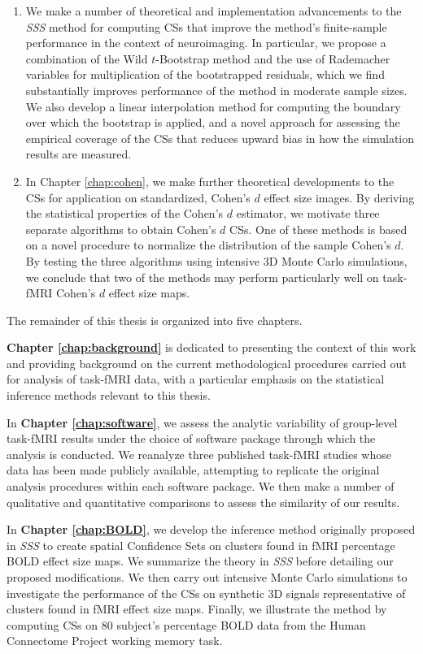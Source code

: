 \begin{enumerate}
\item We make a number of theoretical and implementation advancements to the \textit{SSS} method for computing CSs that improve the method's finite-sample performance in the context of neuroimaging. In particular, we propose a combination of the Wild $t$-Bootstrap method and the use of Rademacher variables for multiplication of the bootstrapped residuals, which we find substantially improves performance of the method in moderate sample sizes. We also develop a linear interpolation method for computing the boundary over which the bootstrap is applied, and a novel approach for assessing the empirical coverage of the CSs that reduces upward bias in how the simulation results are measured.

\item In Chapter \ref{chap:cohen}, we make further theoretical developments to the CSs for application on standardized, Cohen's $d$ effect size images. By deriving the statistical properties of the Cohen's $d$ estimator, we motivate three separate algorithms to obtain Cohen's $d$ CSs. One of these methods is based on a novel procedure to normalize the distribution of the sample Cohen's $d$. By testing the three algorithms using intensive 3D Monte Carlo simulations, we conclude that two of the methods may perform particularly well on task-fMRI Cohen's $d$ effect size maps.

\end{enumerate}


\noindent The remainder of this thesis is organized into five chapters. 

\textbf{Chapter \ref{chap:background}} is dedicated to presenting the context of this work and providing background on the current methodological procedures carried out for analysis of task-fMRI data, with a particular emphasis on the statistical inference methods relevant to this thesis. 

In \textbf{Chapter \ref{chap:software}}, we assess the analytic variability of group-level task-fMRI results under the choice of software package through which the analysis is conducted. We reanalyze three published task-fMRI studies whose data has been made publicly available, attempting to replicate the original analysis procedures within each software package. We then make a number of qualitative and quantitative comparisons to assess the similarity of our results. 

In \textbf{Chapter \ref{chap:BOLD}}, we develop the inference method originally proposed in \textit{SSS} to create spatial Confidence Sets on clusters found in fMRI percentage BOLD effect size maps. We summarize the theory in \textit{SSS} before detailing our proposed modifications. We then carry out intensive Monte Carlo simulations to investigate the performance of the CSs on synthetic 3D signals representative of clusters found in fMRI effect size maps. Finally, we illustrate the method by computing CSs on 80 subject's percentage BOLD data from the Human Connectome Project working memory task.


